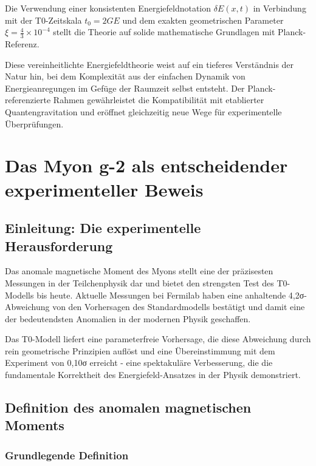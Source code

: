 \documentclass[12pt,a4paper]{report}
\newcommand{\tzero}{t_0}                  %
\begin{document}
	Die Verwendung einer konsistenten Energiefeldnotation $\delta E(x,t)$ in Verbindung mit der T0-Zeitskala $\tzero = 2GE$ und dem exakten geometrischen Parameter $\xi = \frac{4}{3} \times 10^{-4}$ stellt die Theorie auf solide mathematische Grundlagen mit Planck-Referenz.
	
	Diese vereinheitlichte Energiefeldtheorie weist auf ein tieferes Verständnis der Natur hin, bei dem Komplexität aus der einfachen Dynamik von Energieanregungen im Gefüge der Raumzeit selbst entsteht. Der Planck-referenzierte Rahmen gewährleistet die Kompatibilität mit etablierter Quantengravitation und eröffnet gleichzeitig neue Wege für experimentelle Überprüfungen.

\chapter{Das Myon g-2 als entscheidender experimenteller Beweis}
\label{chap:muon_g2}

\section{Einleitung: Die experimentelle Herausforderung}
\label{sec:muon_g2_introduction}

Das anomale magnetische Moment des Myons stellt eine der präzisesten Messungen in der Teilchenphysik dar und bietet den strengsten Test des T0-Modells bis heute. Aktuelle Messungen bei Fermilab haben eine anhaltende 4,2σ-Abweichung von den Vorhersagen des Standardmodells bestätigt und damit eine der bedeutendsten Anomalien in der modernen Physik geschaffen.

Das T0-Modell liefert eine parameterfreie Vorhersage, die diese Abweichung durch rein geometrische Prinzipien auflöst und eine Übereinstimmung mit dem Experiment von 0,10σ erreicht - eine spektakuläre Verbesserung, die die fundamentale Korrektheit des Energiefeld-Ansatzes in der Physik demonstriert.

\section{Definition des anomalen magnetischen Moments}
\label{sec:anomalous_moment_definition}

\subsection{Grundlegende Definition}
\label{subsec:fundamental_definition}
\end{document}
